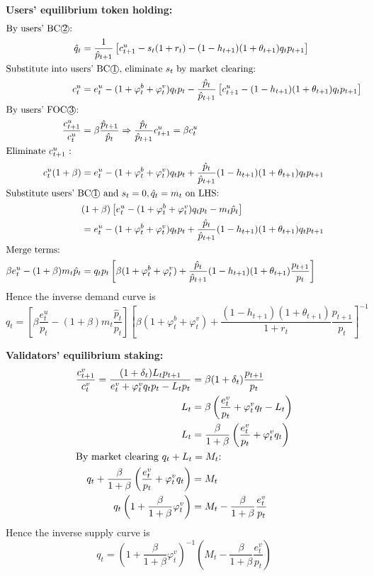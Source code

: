 \documentclass[./main.tex]{subfiles}
\begin{document}
\noindent \textbf{Users' equilibrium token holding:}
\begin{align}
    \intertext{By users' BC\textcircled{2}:}
    \hat{q}_t &= \frac{1}{\hat{p}_{t+1}}\left[c_{t+1}^u -  s_t (1+r_t) - (1-h_{t+1})(1+\theta_{t+1}) q_t p_{t+1} \right]\\
    \intertext{Substitute into users' BC\textcircled{1}, eliminate $s_t$ by market clearing:}
    c_t^u &= e_t^u - (1+ \varphi_t^b+\varphi_t^v) q_t p_t - \frac{\hat{p}_t}{\hat{p}_{t+1}}\left[c_{t+1}^u - (1-h_{t+1})(1+\theta_{t+1}) q_t p_{t+1} \right]\\
    \intertext{By users' FOC\textcircled{3}:} 
    \frac{c_{t+1}^u}{c_t^u}&=\beta\frac{\hat{p}_{t+1}}{\hat{p}_t} \Rightarrow \frac{\hat{p}_t}{\hat{p}_{t+1}}c_{t+1}^u = \beta c_t^u \\
    \intertext{Eliminate $c_{t+1}^u$ :}
    c_t^u(1+\beta) &= e_t^u - (1+ \varphi_t^b+\varphi_t^v) q_t p_t + \frac{\hat{p}_t}{\hat{p}_{t+1}}(1-h_{t+1})(1+\theta_{t+1}) q_t p_{t+1}\\
    \intertext{Substitute users' BC\textcircled{1} and $s_t=0,\hat{q}_t=m_t$ on LHS:}
    &(1+\beta)\left[ e_t^u - (1+ \varphi_t^b+\varphi_t^v) q_t p_t - m_t \hat{p}_t \right] \nonumber \\ 
    &= e_t^u - (1+ \varphi_t^b+\varphi_t^v) q_t p_t + \frac{\hat{p}_t}{\hat{p}_{t+1}}(1-h_{t+1})(1+\theta_{t+1}) q_t p_{t+1}\\
    \intertext{Merge terms:}
    \beta e_t^u - (1+\beta)m_t\hat{p}_t &= q_t p_t \left[\beta(1+ \varphi_t^b+\varphi_t^v) + \frac{\hat{p}_t}{\hat{p}_{t+1}}(1-h_{t+1})(1+\theta_{t+1}) \frac{p_{t+1}}{p_t}\right]
\end{align}
Hence the inverse demand curve is
\begin{equation}
    q_t = \left[ \beta \frac{e_t^u}{p_t} - (1+\beta)m_t \frac{\hat{p}_t}{p_t} \right]
    \left[\beta(1+ \varphi_t^b+\varphi_t^v) + \frac{(1-h_{t+1})(1+\theta_{t+1})}{1+r_t} \frac{p_{t+1}}{p_t}\right]^{-1}
\end{equation}


\noindent \textbf{Validators' equilibrium staking:}
\begin{align}
    \frac{c_{t+1}^v}{c_t^v} = \frac{(1+\delta_t) L_t p_{t+1}}{e_t^v + \varphi_t^v q_t p_t - L_t p_t} &= \beta (1+\delta_t) \frac{p_{t+1}}{p_t}\\
    L_t &= \beta \left(\frac{e_t^v}{p_t} + \varphi_t^v q_t - L_t\right)\\
    L_t &= \frac{\beta}{1+\beta} \left(\frac{e_t^v}{p_t} + \varphi_t^v q_t\right)\\
    \intertext{By market clearing $q_t+L_t=M_t$:}
    q_t+\frac{\beta}{1+\beta} \left(\frac{e_t^v}{p_t} + \varphi_t^v q_t\right) &= M_t\\
    q_t\left(1+\frac{\beta}{1+\beta}\varphi_t^v\right) &= M_t - \frac{\beta}{1+\beta}\frac{e_t^v}{p_t}
\end{align}
Hence the inverse supply curve is
\begin{equation}
    q_t = \left(1+\frac{\beta}{1+\beta}\varphi_t^v\right)^{-1} \left(M_t - \frac{\beta}{1+\beta}\frac{e_t^v}{p_t}\right)
\end{equation}
\end{document}
